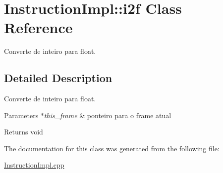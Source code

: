 \hypertarget{class_instruction_impl_1_1i2f}{}\section{Instruction\+Impl\+:\+:i2f Class Reference}
\label{class_instruction_impl_1_1i2f}


Converte de inteiro para float.  




\subsection{Detailed Description}
Converte de inteiro para float. 


\begin{DoxyParams}{Parameters}
{\em $\ast$this\+\_\+frame} & ponteiro para o frame atual \\
\hline
\end{DoxyParams}
\begin{DoxyReturn}{Returns}
void 
\end{DoxyReturn}


The documentation for this class was generated from the following file\+:\begin{DoxyCompactItemize}
\item 
\hyperlink{_instruction_impl_8cpp}{Instruction\+Impl.\+cpp}\end{DoxyCompactItemize}
